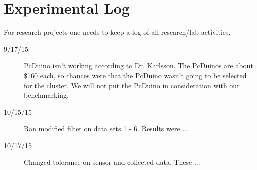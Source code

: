 
\chapter{Experimental Log}

For research projects one needs to keep a log of all research/lab activities.   


\begin{description}
\item [9/17/15]  PcDuino isn't working according to Dr. Karlsson. The PcDuinos are about \$160 each, so chances were that the PcDuino wasn't going to be selected for the cluster. We will not put the PcDuino in consideration with our benchmarking.
\item [10/15/15] Ran modified filter on data sets 1 - 6. Results were ...
\item [10/17/15]  Changed tolerance on sensor and collected data.  These ...
\end{description}